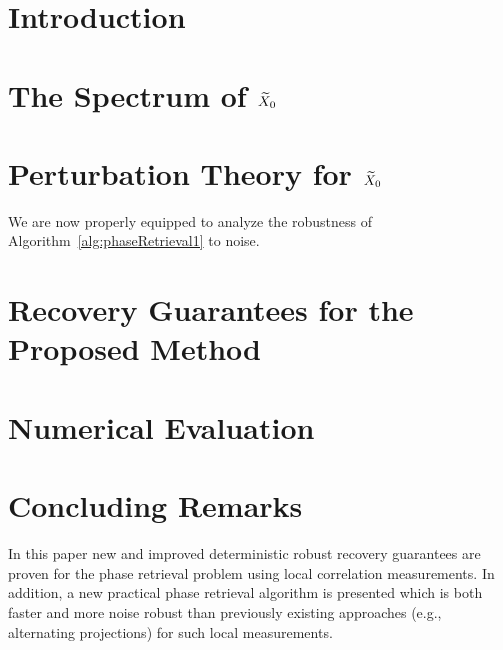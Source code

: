 \label{ch:base_model}

\setcounter{MaxMatrixCols}{20}

\def\SmallColSep{\setlength{\arraycolsep}{0.8\arraycolsep}}


\section{Introduction}
\label{sec:intro}


\section{The Spectrum of $\widetilde{X}_0$}
\label{sec:Spectrum}


\section{Perturbation Theory for $\widetilde{X}_0$}
\label{sec:Perturb}


We are now properly equipped to analyze the robustness of Algorithm~\ref{alg:phaseRetrieval1} to noise.

\section{Recovery Guarantees for the Proposed Method}
\label{sec:RecovGuarantee}
\label{sec:recov_guar}


\section{Numerical Evaluation}
\label{sec:NumEval}


\section{Concluding Remarks}
\label{sec:conclusion}

In this paper new and improved deterministic robust recovery guarantees are proven for the phase retrieval problem using local correlation measurements.  In addition, a new practical phase retrieval algorithm is presented which is both faster and more noise robust than previously existing approaches (e.g., alternating projections) for such local measurements.  

